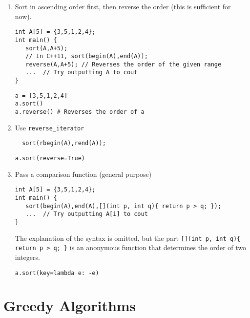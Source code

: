 \begin{enumerate}
\item Sort in ascending order first, then reverse the order (this is sufficient for now).
\begin{cbox}
\begin{verbatim}
int A[5] = {3,5,1,2,4};
int main() {
   sort(A,A+5);
   // In C++11, sort(begin(A),end(A));
   reverse(A,A+5); // Reverses the order of the given range
   ...  // Try outputting A to cout
}
\end{verbatim}
\end{cbox}
\begin{pybox}
\begin{verbatim}
a = [3,5,1,2,4]
a.sort()
a.reverse() # Reverses the order of a
\end{verbatim}
\end{pybox}
\item Use \texttt{reverse\_iterator}
\begin{c14box}[emph={rbegin,rend}]
\begin{verbatim}
  sort(rbegin(A),rend(A));
\end{verbatim}
\end{c14box}
\begin{pybox}
\begin{verbatim}
a.sort(reverse=True)
\end{verbatim}
\end{pybox}
\item Pass a comparison function (general purpose)
\begin{c11box}
\begin{verbatim}
int A[5] = {3,5,1,2,4};
int main() {
   sort(begin(A),end(A),[](int p, int q){ return p > q; });
   ...  // Try outputting A[i] to cout
}
\end{verbatim}
\end{c11box}
The explanation of the syntax is omitted, but the part \texttt{[](int p, int q)\{ return p > q; \}} is an anonymous function that determines the order of two integers.
\begin{pybox}
\begin{verbatim}
a.sort(key=lambda e: -e)
\end{verbatim}
\end{pybox}
\end{enumerate}

\section{Greedy Algorithms}
